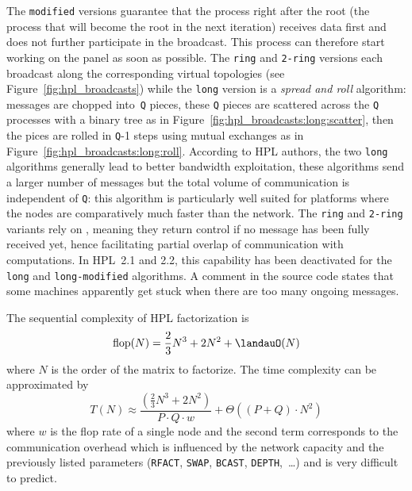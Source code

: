 \begin{itemize}
                The \texttt{modified} versions guarantee that the process right after the root (\ie the process that
                will become the root in the next iteration) receives data first and does not further participate in the
                broadcast. This process can therefore start working on the panel as soon as possible. The \texttt{ring}
                and \texttt{2-ring} versions each broadcast along the corresponding virtual topologies (see
                Figure~\ref{fig:hpl_broadcasts}) while the
                \texttt{long} version is a \emph{spread and roll} algorithm: messages are chopped into \texttt{Q}
                pieces, these \texttt{Q} pieces are scattered across the \texttt{Q} processes with a binary tree as in
                Figure~\ref{fig:hpl_broadcasts:long:scatter}, then the pices are rolled in \texttt{Q}-1 steps using
                mutual exchanges as in Figure~\ref{fig:hpl_broadcasts:long:roll}. According to HPL authors, the two
                \texttt{long} algorithms generally lead to better bandwidth exploitation, these algorithms send a larger
                number of messages but the total volume of communication is independent of \texttt{Q}: this algorithm is
                particularly well suited for platforms where the nodes are comparatively much faster than the network.
                The \texttt{ring} and \texttt{2-ring} variants rely on \iprobe, meaning they return control
                if no message has been fully received yet, hence facilitating partial overlap of communication with
                computations.  In HPL 2.1 and 2.2, this capability has been deactivated for the \texttt{long} and
                \texttt{long-modified} algorithms. A comment in the source code states that some machines apparently get
                stuck when there are too many ongoing messages.
        \end{itemize}

        The sequential complexity of HPL factorization is \[\mathrm{flop}(N) = \frac{2}{3}N^3 + 2N^2 + \landauO(N)\]
        where $N$ is the order of the matrix to factorize. The time complexity can be approximated by \[T(N) \approx
        \frac{\left(\frac{2}{3}N^3 + 2N^2\right)}{P\cdot{}Q\cdot{}w} + \Theta((P+Q)\cdot{}N^2)\] where $w$ is the flop
        rate of a single node and the second term corresponds to the communication overhead which is influenced by the
        network capacity and the previously listed parameters (\texttt{RFACT}, \texttt{SWAP}, \texttt{BCAST},
        \texttt{DEPTH}, \ldots) and is very difficult to predict.

